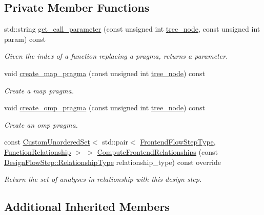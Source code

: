 \subsection*{Private Member Functions}
\begin{DoxyCompactItemize}
\item 
std\+::string \hyperlink{classPragmaAnalysis_a568d30b208cf8dc645246ac355b390bb}{get\+\_\+call\+\_\+parameter} (const unsigned int \hyperlink{classtree__node}{tree\+\_\+node}, const unsigned int param) const
\begin{DoxyCompactList}\small\item\em Given the index of a function replacing a pragma, returns a parameter. \end{DoxyCompactList}\item 
void \hyperlink{classPragmaAnalysis_a61f2585acbea186f129a12e0cc7ef7d0}{create\+\_\+map\+\_\+pragma} (const unsigned int \hyperlink{classtree__node}{tree\+\_\+node}) const
\begin{DoxyCompactList}\small\item\em Create a map pragma. \end{DoxyCompactList}\item 
void \hyperlink{classPragmaAnalysis_ad01dc50d645a9d61e4bf56fdb2ed34f0}{create\+\_\+omp\+\_\+pragma} (const unsigned int \hyperlink{classtree__node}{tree\+\_\+node}) const
\begin{DoxyCompactList}\small\item\em Create an omp pragma. \end{DoxyCompactList}\item 
const \hyperlink{classCustomUnorderedSet}{Custom\+Unordered\+Set}$<$ std\+::pair$<$ \hyperlink{frontend__flow__step_8hpp_afeb3716c693d2b2e4ed3e6d04c3b63bb}{Frontend\+Flow\+Step\+Type}, \hyperlink{classFrontendFlowStep_af7cf30f2023e5b99e637dc2058289ab0}{Function\+Relationship} $>$ $>$ \hyperlink{classPragmaAnalysis_a6c0e611acb6414cc71f044fc9ad2e715}{Compute\+Frontend\+Relationships} (const \hyperlink{classDesignFlowStep_a723a3baf19ff2ceb77bc13e099d0b1b7}{Design\+Flow\+Step\+::\+Relationship\+Type} relationship\+\_\+type) const override
\begin{DoxyCompactList}\small\item\em Return the set of analyses in relationship with this design step. \end{DoxyCompactList}\end{DoxyCompactItemize}
\subsection*{Additional Inherited Members}


